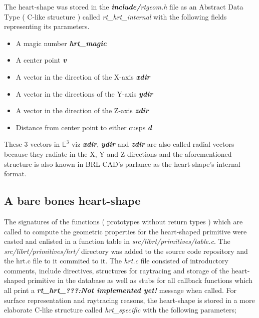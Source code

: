 The   heart-­shape   was   stored   in   the   \textit{\textbf{include/}rtgeom.h}   file   as   an   Abstract   Data  
Type   ( C-­like   structure )   called   \textit{rt\_hrt\_internal}   with   the   following   fields  
representing its parameters.\\
\begin{itemize}  
\item A magic number \textit{\textbf{hrt\_magic }} 
\item A center point \textit{\textbf{v }} 
\item A vector in the direction of the X-­axis \textit{\textbf{xdir}}  
\item A vector in the directions of the Y­-axis \textit{\textbf{ydir}}  
\item A vector in the direction of the Z­-axis \textit{\textbf{zdir}}  
\item Distance from center point to either cusps \textit{\textbf{d}} 
\end{itemize} 
These 3 vectors in $ \mathbb{E}^3 $ viz \textit{\textbf{xdir}}, \textit{\textbf{ydir}} and \textit{\textbf{zdir}}   are   also   called   radial   vectors   because   they   radiate   in   the  X,   Y   and   Z   directions   and   the   aforementioned   structure   is   also   known   in  BRL-­CAD's parlance as the heart-­shape's internal format.

\subsection{A bare bones heart­-shape}

The   signatures   of   the   functions ( prototypes without return types ) which   are   called   to   compute   the  
geometric   properties   for   the   heart-­shaped   primitive   were   casted   and   enlisted   in  
a   function   table   in   \textit{src/librt/primitives/table.c}. The \textit{src/librt/primitives/hrt/}
 directory was added to the source code repository   and  the   hrt.c   file   to   it commited to it. 
The   \textit{hrt.c}   file   consisted   of   introductory   comments,   include 
directives,   structures   for   raytracing   and   storage   of   the   heart­-shaped   primitive   in   the  
database   as   well   as   stubs   for   all   callback   functions   which   all   print   a  
\textit{\textbf{\“rt\_hrt\_???:Not   implemented   yet!\”}}   message   when   called.   For   surface  
representation   and   raytracing   reasons,   the   heart-­shape   is   stored   in   a   more  
elaborate C-­like structure called \textit{hrt\_specific} with the following parameters;  

